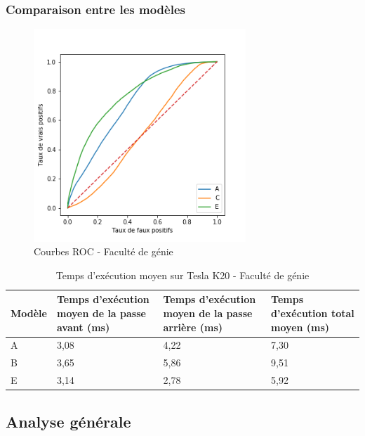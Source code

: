 \subsubsection{Comparaison entre les modèles}
    \begin{figure}[H]
        \centering
        \includegraphics[width=8cm]{images/corridor_roc.png}
        \caption{Courbes ROC - Faculté de génie}
        \label{fig:corridor_roc}
    \end{figure}

    \begin{table}[H]
        \centering
        \caption{Temps d'exécution moyen sur Tesla K20 - Faculté de génie}
        \label{tab:resultat_corridor_temps_execution}
        \begin{tabular}{lp{4cm}p{4cm}p{4cm}}
            \midrule
            Modèle & Temps d'exécution moyen de la passe avant (ms) & Temps d'exécution moyen de la passe arrière (ms) & Temps d'exécution total moyen (ms)\\
            \midrule\midrule
            A & 3,08 & 4,22 & 7,30\\
            B & 3,65 & 5,86 & 9,51\\
            E & 3,14 & 2,78 & 5,92\\
            \midrule
        \end{tabular}
    \end{table}

\subsection{Analyse générale}
    